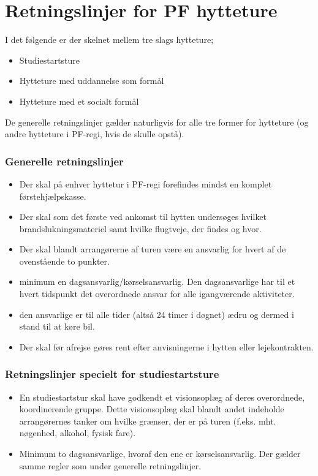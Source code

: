 \section{Retningslinjer for PF hytteture}
I det følgende er der skelnet mellem tre slags hytteture;
\begin{itemize}\addtolength{\itemsep}{-0.5\baselineskip}
\item Studiestartsture
\item Hytteture med uddannelse som formål
\item Hytteture med et socialt formål
\end{itemize}

De generelle retningslinjer gælder naturligvis for alle tre former for hytteture (og andre hytteture i PF-regi, hvis de
skulle opstå).

\subsubsection{Generelle retningslinjer}
\begin{itemize}\addtolength{\itemsep}{-0.5\baselineskip}
\item Der skal på enhver hyttetur i PF-regi forefindes mindst en komplet førstehjælpskasse.
\item Der skal som det første ved ankomst til hytten undersøges hvilket brandslukningsmateriel samt hvilke
flugtveje, der findes og hvor.
\item Der skal blandt arrangørerne af turen være en ansvarlig for hvert af de ovenstående to punkter.
\item minimum en dagsansvarlig/kørselsansvarlig. Den dagsansvarlige har til et hvert tidspunkt det overordnede
ansvar for alle igangværende aktiviteter.
\item den ansvarlige er til alle tider (altså 24 timer i døgnet) ædru og dermed i stand til at køre bil.
\item Der skal før afrejse gøres rent efter anvisningerne i hytten eller lejekontrakten.
\end{itemize}

\subsubsection{Retningslinjer specielt for studiestartsture}
\begin{itemize}\addtolength{\itemsep}{-0.5\baselineskip}
\item En studiestartstur skal have godkendt et visionsoplæg af deres overordnede, koordinerende gruppe. Dette
visionsoplæg skal blandt andet indeholde arrangørernes tanker om hvilke grænser, der er på turen (f.eks. mht.
nøgenhed, alkohol, fysisk fare).
\item Minimum to dagsansvarlige, hvoraf den ene er kørselsansvarlig. Der gælder samme regler som under generelle
retningslinjer.
\end{itemize}

